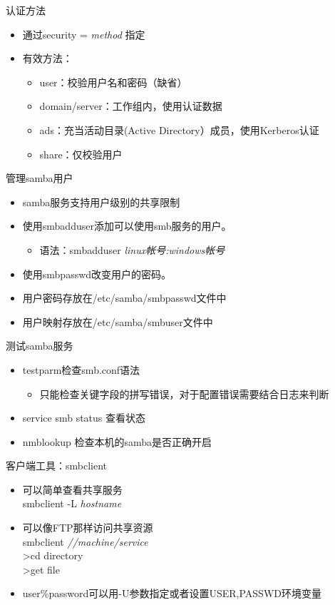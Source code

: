 \begin{frame}{认证方法}
\begin{itemize}
\item 通过security = \emph{method} 指定
\item 有效方法：

\begin{itemize}
\item user：校验用户名和密码（缺省）
\item domain/server：工作组内，使用认证数据
\item ads：充当活动目录(Active Directory）成员，使用Kerberos认证
\item share：仅校验用户
\end{itemize}
\end{itemize}

\end{frame} 
\begin{frame}{管理samba用户}
\begin{itemize}
\item samba服务支持用户级别的共享限制
\item 使用smbadduser添加可以使用smb服务的用户。

\begin{itemize}
\item 语法：smbadduser \emph{linux帐号:windows帐号}
\end{itemize}
\item 使用smbpasswd改变用户的密码。
\item 用户密码存放在/etc/samba/smbpasswd文件中
\item 用户映射存放在/etc/samba/smbuser文件中
\end{itemize}

\end{frame} 
\begin{frame}{测试samba服务}
\begin{itemize}
\item testparm检查smb.conf语法

\begin{itemize}
\item 只能检查关键字段的拼写错误，对于配置错误需要结合日志来判断
\end{itemize}
\item service smb status 查看状态
\item nmblookup 检查本机的samba是否正确开启
\end{itemize}

\end{frame} 
\begin{frame}{客户端工具：smbclient}
\begin{itemize}
\item 可以简单查看共享服务\\
smbclient -L \emph{hostname}
\item 可以像FTP那样访问共享资源\\
smbclient\emph{ //machine/service}\\
>cd directory\\
>get file
\item user\%password可以用-U参数指定或者设置USER,PASSWD环境变量
\end{itemize}

\end{frame} 
